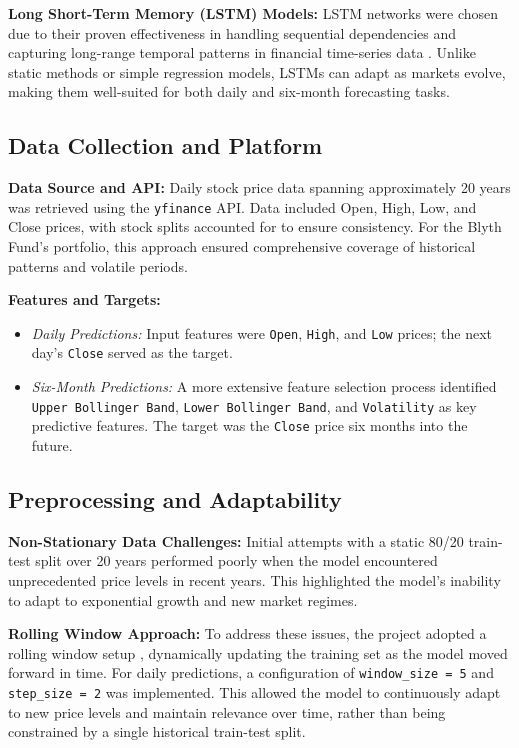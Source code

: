 \documentclass[10pt,twocolumn]{article}
\begin{document}
\textbf{Long Short-Term Memory (LSTM) Models:}  
LSTM networks were chosen due to their proven effectiveness in handling sequential dependencies and capturing long-range temporal patterns in financial time-series data \cite{Hochreiter1997LSTM}. Unlike static methods or simple regression models, LSTMs can adapt as markets evolve, making them well-suited for both daily and six-month forecasting tasks.

\subsection{Data Collection and Platform}

\textbf{Data Source and API:}  
Daily stock price data spanning approximately 20 years was retrieved using the \texttt{yfinance} API. Data included Open, High, Low, and Close prices, with stock splits accounted for to ensure consistency. For the Blyth Fund’s portfolio, this approach ensured comprehensive coverage of historical patterns and volatile periods.

\textbf{Features and Targets:}  
\begin{itemize}
    \item \textit{Daily Predictions:} Input features were \texttt{Open}, \texttt{High}, and \texttt{Low} prices; the next day’s \texttt{Close} served as the target.
    \item \textit{Six-Month Predictions:} A more extensive feature selection process identified \texttt{Upper Bollinger Band}, \texttt{Lower Bollinger Band}, and \texttt{Volatility} as key predictive features. The target was the \texttt{Close} price six months into the future.
\end{itemize}

\subsection{Preprocessing and Adaptability}

\textbf{Non-Stationary Data Challenges:}  
Initial attempts with a static 80/20 train-test split over 20 years performed poorly when the model encountered unprecedented price levels in recent years. This highlighted the model’s inability to adapt to exponential growth and new market regimes.

\textbf{Rolling Window Approach:}  
To address these issues, the project adopted a rolling window setup \cite{Zhan2024SlidingWindow}, dynamically updating the training set as the model moved forward in time. For daily predictions, a configuration of \texttt{window\_size = 5} and \texttt{step\_size = 2} was implemented. This allowed the model to continuously adapt to new price levels and maintain relevance over time, rather than being constrained by a single historical train-test split.
\end{document}
